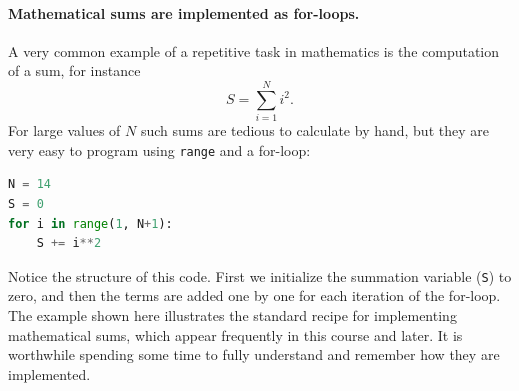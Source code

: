 \documentclass[graybox,envcountchap,sectrefs,final]{svmonodo}
\begin{document}
\paragraph{Mathematical sums are implemented as for-loops.}
A very common example of a repetitive task in mathematics is the computation of a sum, for instance
\[ S = \sum_{i=1}^N i^2 .\]
For large values of $N$ such sums are tedious to calculate by hand, but they are very easy to program using \texttt{range} and a for-loop:
\begin{lstlisting}[language=Python,style=blue1]
N = 14
S = 0
for i in range(1, N+1):
    S += i**2
\end{lstlisting}
Notice the structure of this code. First we initialize the summation variable (\texttt{S}) to zero, and then the terms are added one by
one for each iteration of the for-loop. The example shown here illustrates the standard recipe for implementing mathematical sums, which
appear frequently in this course and later. It is worthwhile spending some time to
fully understand and remember how they are implemented.
\end{document}
